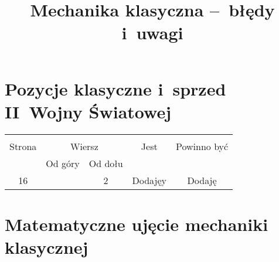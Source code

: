 \documentclass[a4paper,11pt]{article}
\title{Mechanika klasyczna --~błędy i~uwagi}
\begin{document}



\maketitle %



\section{Pozycje klasyczne i~sprzed II~Wojny Światowej}

\vspace{\spaceThree}



\begin{center}
  \begin{tabular}{|c|c|c|c|c|}
    \hline
    & \multicolumn{2}{c|}{} & & \\
    Strona & \multicolumn{2}{c|}{Wiersz} & Jest
                              & Powinno być \\ \cline{2-3}
    & Od góry & Od dołu & & \\
    \hline
    16  & &  2 & Dodajęy & Dodaję \\
    \hline
  \end{tabular}
\end{center}

\vspace{\spaceTwo}







\newpage
\section{Matematyczne ujęcie mechaniki klasycznej}
\end{document}
